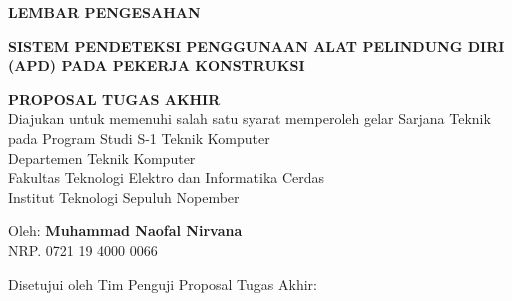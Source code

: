 
\begin{center}
  \large
  \textbf{LEMBAR PENGESAHAN}
\end{center}

\thispagestyle{empty}

\begin{center}
  \textbf{SISTEM PENDETEKSI PENGGUNAAN ALAT PELINDUNG DIRI (APD) PADA PEKERJA KONSTRUKSI}
\end{center}

\begingroup
\small

\begin{center}
  \textbf{PROPOSAL TUGAS AKHIR} \\
  Diajukan untuk memenuhi salah satu syarat memperoleh gelar
  Sarjana Teknik pada
  Program Studi S-1 Teknik Komputer \\
  Departemen Teknik Komputer \\
  Fakultas Teknologi Elektro dan Informatika Cerdas \\
  Institut Teknologi Sepuluh Nopember
\end{center}

\begin{center}
  Oleh: \textbf{Muhammad Naofal Nirvana} \\
  NRP. 0721 19 4000 0066
\end{center}

\begin{center}
  Disetujui oleh Tim Penguji Proposal Tugas Akhir:
\end{center}

\begingroup
\setlength{\tabcolsep}{0pt}

